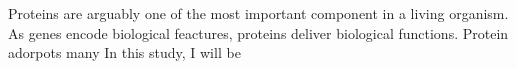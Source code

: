 Proteins are arguably one of the most important component in a living organism. As genes encode biological feactures, proteins deliver biological functions. Protein adorpots many  In this study, I will be 